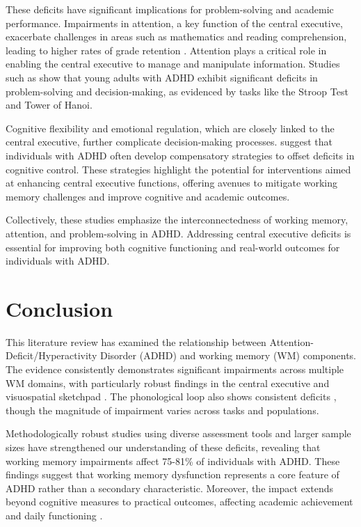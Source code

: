 \documentclass[stu]{apa7}
\begin{document}
These deficits have significant implications for problem-solving and academic performance. Impairments in attention, a key function of the central executive, exacerbate challenges in areas such as mathematics and reading comprehension, leading to higher rates of grade retention \parencite{fried_clinical_2016,friedman_reading_2017}. Attention plays a critical role in enabling the central executive to manage and manipulate information. Studies such as \textcite{capri_attention_2019} show that young adults with ADHD exhibit significant deficits in problem-solving and decision-making, as evidenced by tasks like the Stroop Test and Tower of Hanoi.

Cognitive flexibility and emotional regulation, which are closely linked to the central executive, further complicate decision-making processes. \textcite{drigas_executive_2019} suggest that individuals with ADHD often develop compensatory strategies to offset deficits in cognitive control. These strategies highlight the potential for interventions aimed at enhancing central executive functions, offering avenues to mitigate working memory challenges and improve cognitive and academic outcomes.

Collectively, these studies emphasize the interconnectedness of working memory, attention, and problem-solving in ADHD. Addressing central executive deficits is essential for improving both cognitive functioning and real-world outcomes for individuals with ADHD.

\section{Conclusion}

This literature review has examined the relationship between Attention-Deficit/Hyperactivity Disorder (ADHD) and working memory (WM) components. The evidence consistently demonstrates significant impairments across multiple WM domains, with particularly robust findings in the central executive \parencite{mccabe_relationship_2010} and visuospatial sketchpad \parencite{butzbach_basic_2019}. The phonological loop also shows consistent deficits \parencite{friedman_reading_2017}, though the magnitude of impairment varies across tasks and populations.

Methodologically robust studies using diverse assessment tools and larger sample sizes \parencite{fried_clinical_2016} have strengthened our understanding of these deficits, revealing that working memory impairments affect 75-81\% of individuals with ADHD. These findings suggest that working memory dysfunction represents a core feature of ADHD rather than a secondary characteristic. Moreover, the impact extends beyond cognitive measures to practical outcomes, affecting academic achievement and daily functioning \parencite{kofler_working_2020}.
\end{document}
